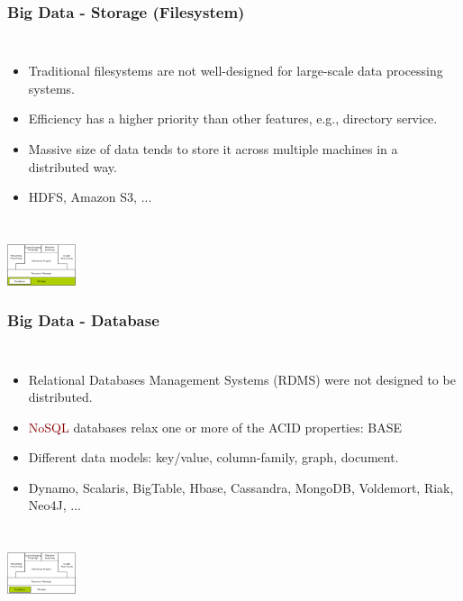 \documentclass{beamer}
\begin{document}
\begin{frame}
\frametitle{Big Data - Storage (Filesystem)}
\begin{columns}
\column{30em}
\begin{itemize}\itemsep1em
  \item Traditional filesystems are not well-designed for large-scale data processing systems. 
  \item \textcolor{TextGreen}{Efficiency} has a higher priority than other features, e.g., directory service. 
  \item Massive size of data tends to store it across \textcolor{Ocean}{multiple machines} in a distributed way. 
  \item HDFS, Amazon S3, ...
\end{itemize}
\end{columns}
\vspace{1.2cm}
\hspace*{10cm}\includegraphics[width=2cm]{figs/stack_storage.pdf}
\end{frame}

\begin{frame}
\frametitle{Big Data - Database}
\begin{columns}
\column{30em}
\begin{itemize}\itemsep1em
  \justifying
  \item Relational Databases Management Systems \textcolor{Ocean}{(RDMS)} were \textcolor{TextGreen}{not} designed to be distributed.
  \item \textcolor{darkred}{NoSQL} databases \textcolor{Ocean}{relax} one or more of the \textcolor{Ocean}{ACID} properties: \textcolor{TextGreen}{BASE}
  \item Different data models: \textcolor{Ocean}{key/value}, \textcolor{Ocean}{column-family}, \textcolor{Ocean}{graph}, \textcolor{Ocean}{document}.
  \item Dynamo, Scalaris, BigTable, Hbase, Cassandra, MongoDB, Voldemort, Riak, Neo4J, ...
\end{itemize}
\end{columns}
\vspace{1.83cm}
\hspace*{10cm}\includegraphics[width=2cm]{figs/stack_database.pdf}
\end{frame}
\end{document}
